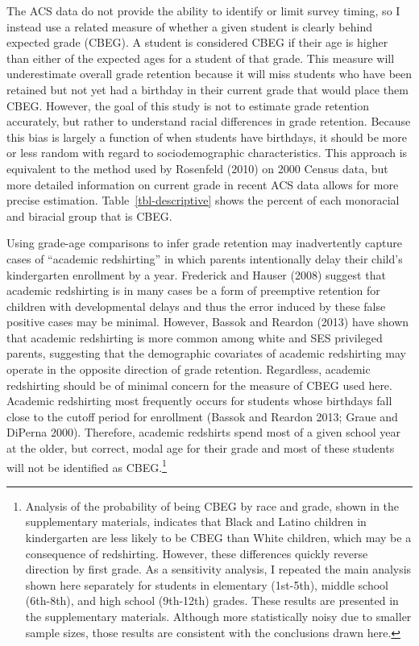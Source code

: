 \documentclass[
  letterpaper,
  DIV=11,
  numbers=noendperiod]{scrartcl}
\begin{document}
The ACS data do not provide the ability to identify or limit survey
timing, so I instead use a related measure of whether a given student is
clearly behind expected grade (CBEG). A student is considered CBEG if
their age is higher than either of the expected ages for a student of
that grade. This measure will underestimate overall grade retention
because it will miss students who have been retained but not yet had a
birthday in their current grade that would place them CBEG. However, the
goal of this study is not to estimate grade retention accurately, but
rather to understand racial differences in grade retention. Because this
bias is largely a function of when students have birthdays, it should be
more or less random with regard to sociodemographic characteristics.
This approach is equivalent to the method used by Rosenfeld (2010) on
2000 Census data, but more detailed information on current grade in
recent ACS data allows for more precise estimation.
Table~\ref{tbl-descriptive} shows the percent of each monoracial and
biracial group that is CBEG.

Using grade-age comparisons to infer grade retention may inadvertently
capture cases of ``academic redshirting'' in which parents intentionally
delay their child's kindergarten enrollment by a year. Frederick and
Hauser (2008) suggest that academic redshirting is in many cases be a
form of preemptive retention for children with developmental delays and
thus the error induced by these false positive cases may be minimal.
However, Bassok and Reardon (2013) have shown that academic redshirting
is more common among white and SES privileged parents, suggesting that
the demographic covariates of academic redshirting may operate in the
opposite direction of grade retention. Regardless, academic redshirting
should be of minimal concern for the measure of CBEG used here. Academic
redshirting most frequently occurs for students whose birthdays fall
close to the cutoff period for enrollment (Bassok and Reardon 2013;
Graue and DiPerna 2000). Therefore, academic redshirts spend most of a
given school year at the older, but correct, modal age for their grade
and most of these students will not be identified as CBEG.\footnote{Analysis
  of the probability of being CBEG by race and grade, shown in the
  supplementary materials, indicates that Black and Latino children in
  kindergarten are less likely to be CBEG than White children, which may
  be a consequence of redshirting. However, these differences quickly
  reverse direction by first grade. As a sensitivity analysis, I
  repeated the main analysis shown here separately for students in
  elementary (1st-5th), middle school (6th-8th), and high school
  (9th-12th) grades. These results are presented in the supplementary
  materials. Although more statistically noisy due to smaller sample
  sizes, those results are consistent with the conclusions drawn here.}
\end{document}
